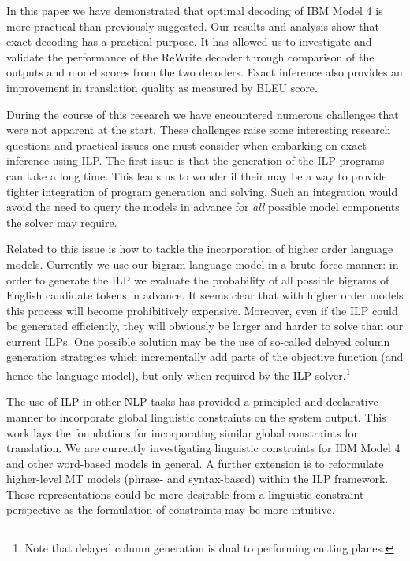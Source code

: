 In this paper we have demonstrated that optimal decoding of IBM Model
4 is more practical than previously suggested.  Our results and
analysis show that exact decoding has a practical purpose.  It has
allowed us to investigate and validate the performance of the ReWrite
decoder through comparison of the outputs and model scores from the
two decoders.  Exact inference also provides an improvement in
translation quality as measured by BLEU score.

During the course of this research we have encountered numerous
challenges that were not apparent at the start.  These challenges
raise some interesting research questions and practical issues one
must consider when embarking on exact inference using ILP.  The first
issue is that the generation of the ILP programs can take a long time.
This leads us to wonder if their may be a way to provide tighter
integration of program generation and solving.  Such an integration
would avoid the need to query the models in advance for \emph{all}
possible model components the solver may require.

Related to this issue is how to tackle the incorporation of higher
order language models. Currently we use our bigram language model in a
brute-force manner: in order to generate the ILP we evaluate the
probability of all possible bigrams of English candidate tokens in
advance. It seems clear that with higher order models this process
will become prohibitively expensive. Moreover, even if the ILP could
be generated efficiently, they will obviously be larger and harder to
solve than our current ILPs. One possible solution may be the use of
so-called delayed column generation strategies which incrementally add
parts of the objective function (and hence the language model), but
only when required by the ILP solver.\footnote{Note that delayed
  column generation is dual to performing cutting planes.}

The use of ILP in other NLP tasks has provided a principled and
declarative manner to incorporate global linguistic constraints on the
system output.  This work lays the foundations for incorporating
similar global constraints for translation.  We are currently
investigating linguistic constraints for IBM Model 4 and other
word-based models in general.  A further extension is to reformulate
higher-level MT models (phrase- and syntax-based) within the ILP
framework.  These representations could be more desirable from a
linguistic constraint perspective as the formulation of constraints
may be more intuitive.


